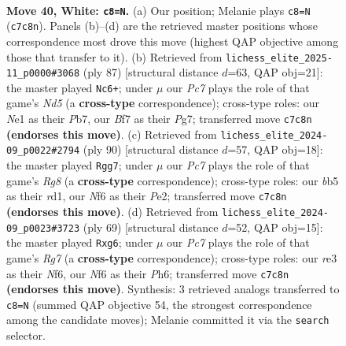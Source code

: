\documentclass[11pt]{article}
\begin{document}
\clearpage

\begin{figure}[p]\centering
\begin{subfigure}{0.46\textwidth}\centering
\resizebox{\linewidth}{!}{%
\newchessgame
\chessboard[
  setfen={r7/1kP2B2/5N2/pb3p2/7R/4r3/1P4P1/R2KN3 w - - 0 40},
  showmover=false,
  pgfstyle=straightmove, color=movearrow, markmove={c7-c8}
]}
\caption{}
\end{subfigure}\hfill
\begin{subfigure}{0.46\textwidth}\centering
\resizebox{\linewidth}{!}{%
\newchessgame
\chessboard[
  setfen={k3r3/1p2P1p1/p5P1/3pK1B1/3n2P1/2p4P/5R2/8 b - - 3 44},
  showmover=false,
  pgfstyle=straightmove, color=movearrow, markmove={d4-c6}
]}
\caption{}
\end{subfigure}
\\[4pt]
\begin{subfigure}{0.46\textwidth}\centering
\resizebox{\linewidth}{!}{%
\newchessgame
\chessboard[
  setfen={6R1/1kp1R3/2p5/5b1p/N6r/1P6/P3PK2/3r4 w - - 11 46},
  showmover=false,
  pgfstyle=straightmove, color=movearrow, markmove={g8-g7}
]}
\caption{}
\end{subfigure}\hfill
\begin{subfigure}{0.46\textwidth}\centering
\resizebox{\linewidth}{!}{%
\newchessgame
\chessboard[
  setfen={6k1/4r1p1/4PnBp/3R4/8/7P/6r1/4RK2 b - - 0 35},
  showmover=false,
  pgfstyle=straightmove, color=movearrow, markmove={g2-g6}
]}
\caption{}
\end{subfigure}
\caption{\textbf{Move 40, White: \texttt{c8=N}.} (a) Our position; Melanie plays \texttt{c8=N} (\texttt{c7c8n}). Panels (b)--(d) are the retrieved master positions whose correspondence most drove this move (highest QAP objective among those that transfer to it). (b) Retrieved from \texttt{lichess\_elite\_2025-11\_p0000\#3068} (ply 87) [structural distance $d$=63, QAP obj=21]: the master played \texttt{Nc6+}; under $\mu$ our \emph{Pc7} plays the role of that game's \emph{Nd5} (a \textbf{cross-type} correspondence); cross-type roles: our \emph{N}e1 as their \emph{P}b7, our \emph{B}f7 as their \emph{P}g7; transferred move \texttt{c7c8n} \textbf{(endorses this move)}. (c) Retrieved from \texttt{lichess\_elite\_2024-09\_p0022\#2794} (ply 90) [structural distance $d$=57, QAP obj=18]: the master played \texttt{Rgg7}; under $\mu$ our \emph{Pc7} plays the role of that game's \emph{Rg8} (a \textbf{cross-type} correspondence); cross-type roles: our \emph{b}b5 as their \emph{r}d1, our \emph{N}f6 as their \emph{P}e2; transferred move \texttt{c7c8n} \textbf{(endorses this move)}. (d) Retrieved from \texttt{lichess\_elite\_2024-09\_p0023\#3723} (ply 69) [structural distance $d$=52, QAP obj=15]: the master played \texttt{Rxg6}; under $\mu$ our \emph{Pc7} plays the role of that game's \emph{Rg7} (a \textbf{cross-type} correspondence); cross-type roles: our \emph{r}e3 as their \emph{N}f6, our \emph{N}f6 as their \emph{P}h6; transferred move \texttt{c7c8n} \textbf{(endorses this move)}. Synthesis: 3 retrieved analogs transferred to \texttt{c8=N} (summed QAP objective 54, the strongest correspondence among the candidate moves); Melanie committed it via the \texttt{search} selector.}
\label{fig:thought-m78}
\end{figure}
\end{document}

